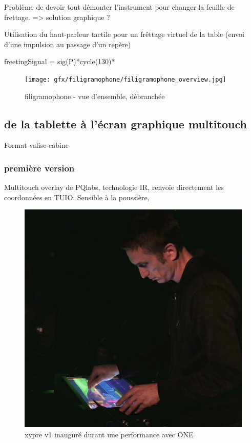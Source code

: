 Problème de devoir tout démonter l'instrument pour changer la feuille de frettage. => solution graphique ?

Utilisation du haut-parleur tactile pour un frêttage virtuel de la table (envoi d'une impulsion au passage d'un repère)


freetingSignal = sig(P)*cycle(130)*

\begin{figure}[!htbp]
	\texttt{[image: gfx/filigramophone/filigramophone\_overview.jpg]}
	\caption{filigramophone - vue d'ensemble, débranchée}
	\label{fig:interface:filigramophone}
\end{figure}

\subsection{de la tablette à l'écran graphique multitouch}

Format valise-cabine

\subsubsection{première version}
Multitouch overlay de PQlabs, technologie IR, renvoie directement les coordonnées en TUIO. Sensible à la poussière,
\begin{figure}[!htbp]
	\includegraphics[width=\textwidth]{gfx/04_interfaces/xypre-v1_72dpi.jpg}
	\caption{xypre v1 inauguré durant une performance avec ONE}
	\label{fig:interface:xyprev1_jeu}
\end{figure}

